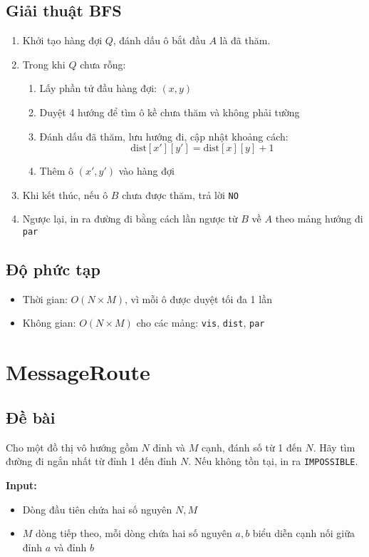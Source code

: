\documentclass{article}
\begin{document}
	\subsection*{Giải thuật BFS}
	\begin{enumerate}
		\item Khởi tạo hàng đợi \( Q \), đánh dấu ô bắt đầu \( A \) là đã thăm.
		\item Trong khi \( Q \) chưa rỗng:
		\begin{enumerate}
			\item Lấy phần tử đầu hàng đợi: \( (x, y) \)
			\item Duyệt 4 hướng để tìm ô kề chưa thăm và không phải tường
			\item Đánh dấu đã thăm, lưu hướng đi, cập nhật khoảng cách:
			\[
			\text{dist}[x'][y'] = \text{dist}[x][y] + 1
			\]
			\item Thêm ô \( (x', y') \) vào hàng đợi
		\end{enumerate}
		\item Khi kết thúc, nếu ô \( B \) chưa được thăm, trả lời \texttt{NO}
		\item Ngược lại, in ra đường đi bằng cách lần ngược từ \( B \) về \( A \) theo mảng hướng đi \texttt{par}
	\end{enumerate}
	
	\subsection*{Độ phức tạp}
	\begin{itemize}
		\item Thời gian: \( O(N \times M) \), vì mỗi ô được duyệt tối đa 1 lần
		\item Không gian: \( O(N \times M) \) cho các mảng: \texttt{vis}, \texttt{dist}, \texttt{par}
	\end{itemize}
	
	\section{MessageRoute}
	\subsection*{Đề bài}
	Cho một đồ thị vô hướng gồm \( N \) đỉnh và \( M \) cạnh, đánh số từ 1 đến \( N \). Hãy tìm đường đi ngắn nhất từ đỉnh 1 đến đỉnh \( N \). Nếu không tồn tại, in ra \texttt{IMPOSSIBLE}.
	
	\textbf{Input:}
	\begin{itemize}
		\item Dòng đầu tiên chứa hai số nguyên \( N, M \)
		\item \( M \) dòng tiếp theo, mỗi dòng chứa hai số nguyên \( a, b \) biểu diễn cạnh nối giữa đỉnh \( a \) và đỉnh \( b \)
	\end{itemize}
	
\end{document}
